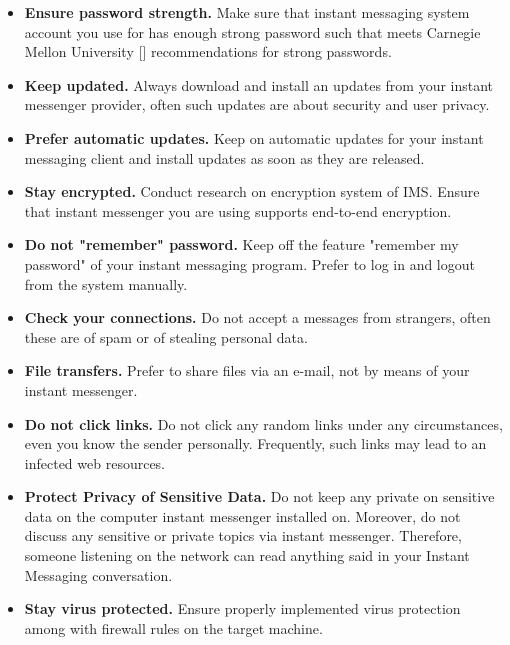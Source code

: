 \begin{itemize}
    \item \textbf{Ensure password strength.} Make sure that instant messaging system account you use for has enough
    strong password such that meets Carnegie Mellon University [\cite{shay2010encountering}] recommendations
    for strong passwords.
    \item \textbf{Keep updated.} Always download and install an updates from your instant messenger provider,
    often such updates are about security and user privacy.
    \item \textbf{Prefer automatic updates.} Keep on automatic updates for your instant messaging client and install
    updates as soon as they are released.
    \item \textbf{Stay encrypted.} Conduct research on encryption system of IMS\@.
    Ensure that instant messenger you are using supports end-to-end encryption.
    \item \textbf{Do not "remember" password.} Keep off the feature "remember my password" of your
    instant messaging program.
    Prefer to log in and logout from the system manually.
    \item \textbf{Check your connections.} Do not accept a messages from strangers, often these are of spam or of stealing
    personal data.
    \item \textbf{File transfers.} Prefer to share files via an e-mail, not by means of your instant messenger.
    \item \textbf{Do not click links.} Do not click any random links under any circumstances, even you know the sender
    personally.
    Frequently, such links may lead to an infected web resources.
    \item \textbf{Protect Privacy of Sensitive Data.}
    Do not keep any private on sensitive data on the computer instant messenger installed on.
    Moreover, do not discuss any sensitive or private topics via instant messenger.
    Therefore, someone listening on the network can read anything said in your Instant Messaging conversation.
    \item \textbf{Stay virus protected.} Ensure properly implemented virus protection among with firewall rules
    on the target machine.
\end{itemize}


